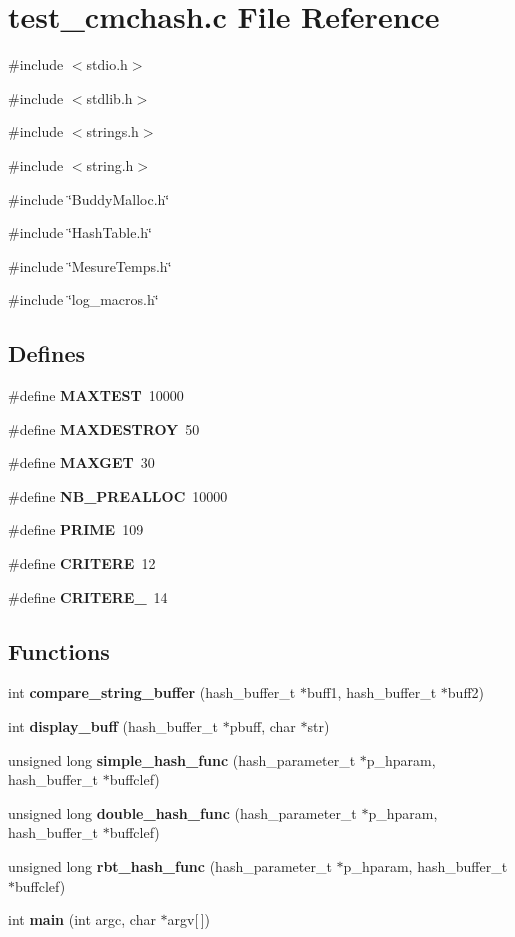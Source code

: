 \section{test\_\-cmchash.c File Reference}
\label{test__cmchash_8c}
{\ttfamily \#include $<$stdio.h$>$}\par
{\ttfamily \#include $<$stdlib.h$>$}\par
{\ttfamily \#include $<$strings.h$>$}\par
{\ttfamily \#include $<$string.h$>$}\par
{\ttfamily \#include \char`\"{}BuddyMalloc.h\char`\"{}}\par
{\ttfamily \#include \char`\"{}HashTable.h\char`\"{}}\par
{\ttfamily \#include \char`\"{}MesureTemps.h\char`\"{}}\par
{\ttfamily \#include \char`\"{}log\_\-macros.h\char`\"{}}\par
\subsection*{Defines}
\begin{DoxyCompactItemize}
\item 
\#define {\bf MAXTEST}~10000
\item 
\#define {\bf MAXDESTROY}~50
\item 
\#define {\bf MAXGET}~30
\item 
\#define {\bf NB\_\-PREALLOC}~10000
\item 
\#define {\bf PRIME}~109
\item 
\#define {\bf CRITERE}~12
\item 
\#define {\bf CRITERE\_}~14
\end{DoxyCompactItemize}
\subsection*{Functions}
\begin{DoxyCompactItemize}
\item 
int {\bf compare\_\-string\_\-buffer} (hash\_\-buffer\_\-t $\ast$buff1, hash\_\-buffer\_\-t $\ast$buff2)
\item 
int {\bf display\_\-buff} (hash\_\-buffer\_\-t $\ast$pbuff, char $\ast$str)
\item 
unsigned long {\bf simple\_\-hash\_\-func} (hash\_\-parameter\_\-t $\ast$p\_\-hparam, hash\_\-buffer\_\-t $\ast$buffclef)
\item 
unsigned long {\bf double\_\-hash\_\-func} (hash\_\-parameter\_\-t $\ast$p\_\-hparam, hash\_\-buffer\_\-t $\ast$buffclef)
\item 
unsigned long {\bf rbt\_\-hash\_\-func} (hash\_\-parameter\_\-t $\ast$p\_\-hparam, hash\_\-buffer\_\-t $\ast$buffclef)
\item 
int {\bf main} (int argc, char $\ast$argv[$\,$])
\end{DoxyCompactItemize}


